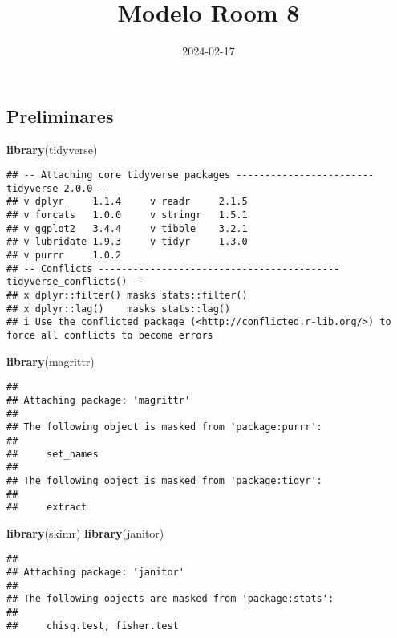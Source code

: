 \documentclass[
]{article}
\title{Modelo Room 8}
\author{}
\date{\vspace{-2.5em}2024-02-17}
\newenvironment{Shaded}{\begin{snugshade}}{\end{snugshade}}
\newcommand{\FunctionTok}[1]{\textcolor[rgb]{0.13,0.29,0.53}{\textbf{#1}}}
\newcommand{\NormalTok}[1]{#1}
\begin{document}
\maketitle

\hypertarget{preliminares}{%
\subsection{Preliminares}\label{preliminares}}

\begin{Shaded}
\begin{Highlighting}[]
\FunctionTok{library}\NormalTok{(tidyverse)}
\end{Highlighting}
\end{Shaded}

\begin{verbatim}
## -- Attaching core tidyverse packages ------------------------ tidyverse 2.0.0 --
## v dplyr     1.1.4     v readr     2.1.5
## v forcats   1.0.0     v stringr   1.5.1
## v ggplot2   3.4.4     v tibble    3.2.1
## v lubridate 1.9.3     v tidyr     1.3.0
## v purrr     1.0.2     
## -- Conflicts ------------------------------------------ tidyverse_conflicts() --
## x dplyr::filter() masks stats::filter()
## x dplyr::lag()    masks stats::lag()
## i Use the conflicted package (<http://conflicted.r-lib.org/>) to force all conflicts to become errors
\end{verbatim}

\begin{Shaded}
\begin{Highlighting}[]
\FunctionTok{library}\NormalTok{(magrittr)}
\end{Highlighting}
\end{Shaded}

\begin{verbatim}
## 
## Attaching package: 'magrittr'
## 
## The following object is masked from 'package:purrr':
## 
##     set_names
## 
## The following object is masked from 'package:tidyr':
## 
##     extract
\end{verbatim}

\begin{Shaded}
\begin{Highlighting}[]
\FunctionTok{library}\NormalTok{(skimr)}
\FunctionTok{library}\NormalTok{(janitor)}
\end{Highlighting}
\end{Shaded}

\begin{verbatim}
## 
## Attaching package: 'janitor'
## 
## The following objects are masked from 'package:stats':
## 
##     chisq.test, fisher.test
\end{verbatim}
\end{document}

